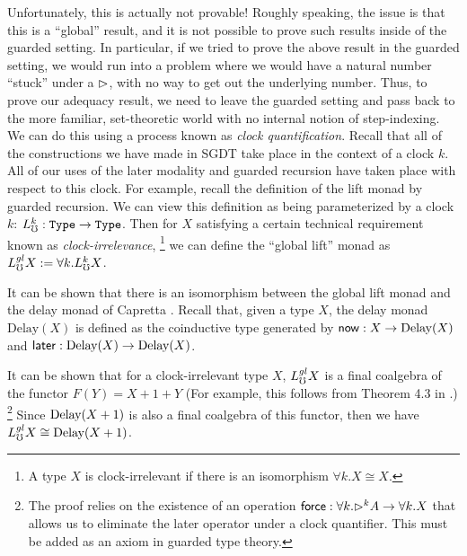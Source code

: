 %
Unfortunately, this is actually not provable!
Roughly speaking, the issue is that this is a ``global'' result, and it is not possible
to prove such results inside of the guarded setting. 
In particular, if we tried to prove the above result in the guarded
setting, we would run into a problem where we would have a natural number
``stuck'' under a ${\vartriangleright}$, with no way to get out the underlying number.
%
Thus, to prove our adequacy result, we need to leave the guarded setting and pass back
to the more familiar, set-theoretic world with no internal notion of step-indexing.
We can do this using a process known as \emph{clock quantification}.
Recall that all of the constructions we have made in SGDT take place in the context of a clock $k$.
All of our uses of the later modality and guarded recursion have taken place with respect to this clock.
For example, recall the definition of the lift monad by guarded recursion.
We can view this definition as being parameterized by a clock $k$: $L_\mho^k : \texttt{Type} \to \texttt{Type}$.
Then for $X$ satisfying a certain technical requirement known as \emph{clock-irrelevance},
\footnote{A type $X$ is clock-irrelevant if there is an isomorphism $\forall k.X \cong X$.}
we can define the ``global lift'' monad as $L_\mho^{gl} X := \forall k. L_\mho^k X$.

It can be shown that there is an isomorphism between the global lift monad and the
delay monad of Capretta \cite{lmcs:2265}.
Recall that, given a type $X$, the delay monad $\text{Delay}(X)$ is defined as the coinductive
type generated by 
$\mathsf{now} : X \to \text{Delay}(X)$ and $\mathsf{later} : \text{Delay}(X) \to \text{Delay}(X)$.



It can be shown that for a clock-irrelevant type $X$, $L_\mho^{gl} X$ is a final
coalgebra of the functor $F(Y) = X + 1 + Y$ (For example, this follows from Theorem 4.3 in
\cite{kristensen-mogelberg-vezzosi2022}.) 
\footnote{The proof relies on the existence of an operation  
$\mathsf{force} : \forall k. {\vartriangleright}^k A \to \forall k. X$ that
allows us to eliminate the later operator under a clock quantifier.
This must be added as an axiom in guarded type theory.}
Since $\text{Delay}(X + 1)$ is also a final coalgebra
of this functor, then we have $L_\mho^{gl} X \cong \text{Delay}(X + 1)$.

